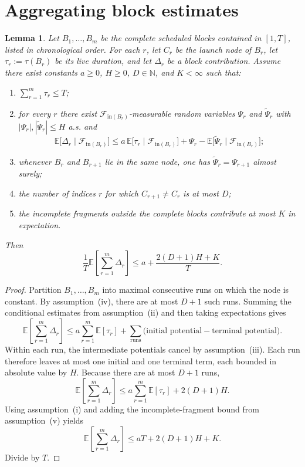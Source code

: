 \documentclass[12pt]{article}
\newtheorem{lemma}[theorem]{Lemma}
\theoremstyle{definition}
\newcommand{\N}{\mathbb{N}}
\newcommand{\E}{\mathbb{E}}
\newcommand{\1}{\mathbf{1}}
\newcommand{\cF}{\mathcal{F}}
\begin{document}
\section{Aggregating block estimates}
\label{app:aggregation}

\begin{lemma}
\label{lem:aggregation}
Let $B_1,\dots,B_m$ be the complete scheduled blocks contained in $[1,T]$,
listed in chronological order. For each $r$, let $C_r$ be the launch node of
$B_r$, let $\tau_r:=\tau(B_r)$ be its live duration, and let $\Delta_r$ be a
block contribution.
Assume there exist constants $a\ge 0$, $H\ge 0$, $D\in\N$, and $K<\infty$ such that:
\begin{enumerate}[label=\textnormal{(\roman*)},leftmargin=2.6em]
\item $\sum_{r=1}^m \tau_r\le T$;
\item for every $r$ there exist $\cF_{\mathrm{in}(B_r)}$-measurable random variables
$\Psi_r$ and $\widetilde\Psi_r$ with $|\Psi_r|,|\widetilde\Psi_r|\le H$ a.s. and
\[
\E\bigl[\Delta_r\mid \cF_{\mathrm{in}(B_r)}\bigr]
\le
a\,\E\bigl[\tau_r\mid \cF_{\mathrm{in}(B_r)}\bigr]
+
\Psi_r-\E\bigl[\widetilde\Psi_r\mid \cF_{\mathrm{in}(B_r)}\bigr];
\]
\item whenever $B_r$ and $B_{r+1}$ lie in the same node, one has
$\widetilde\Psi_r=\Psi_{r+1}$ almost surely;
\item the number of indices $r$ for which $C_{r+1}\neq C_r$ is at most $D$;
\item the incomplete fragments outside the complete blocks contribute at most $K$
in expectation.
\end{enumerate}
Then
\[
\frac1T\E\left[\sum_{r=1}^m \Delta_r\right]
\le a + \frac{2(D+1)H+K}{T}.
\]
\end{lemma}

\begin{proof}
Partition $B_1,\dots,B_m$ into maximal consecutive runs on which the node is
constant. By assumption~(iv), there are at most $D+1$ such runs. Summing the
conditional estimates from assumption~(ii) and then taking expectations gives
\[
\E\left[\sum_{r=1}^m \Delta_r\right]
\le
a\sum_{r=1}^m \E[\tau_r]
+
\sum_{\text{runs}}
\bigl(\text{initial potential} - \text{terminal potential}\bigr).
\]
Within each run, the intermediate potentials cancel by assumption~(iii). Each run
therefore leaves at most one initial and one terminal term, each bounded in
absolute value by $H$. Because there are at most $D+1$ runs,
\[
\E\left[\sum_{r=1}^m \Delta_r\right]
\le
a\sum_{r=1}^m \E[\tau_r] + 2(D+1)H.
\]
Using assumption~(i) and adding the incomplete-fragment bound from assumption~(v)
yields
\[
\E\left[\sum_{r=1}^m \Delta_r\right]
\le
aT + 2(D+1)H + K.
\]
Divide by $T$.
\end{proof}
\end{document}
